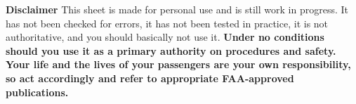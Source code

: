 
\begin{tiny}
   \textbf{Disclaimer} This sheet is made for
  personal use and is still work in progress.  It has not been checked
  for errors, it has not been tested in practice, it is not
  authoritative, and you should basically not use it.  \textbf{Under
    no conditions should you use it as a primary authority on
    procedures and safety.  Your life and the lives of your passengers
    are your own responsibility, so act accordingly and refer to
    appropriate FAA-approved publications.}
\end{tiny}
